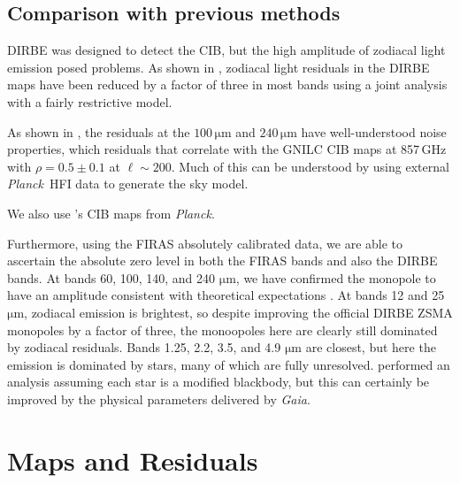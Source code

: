 \documentclass{aa}
\def\Planck{\textit{Planck}}
\begin{document}
\subsection{Comparison with previous methods}

DIRBE was designed to detect the CIB, but the high amplitude of zodiacal light emission posed problems. As shown in \citet{CG02_02}, zodiacal light residuals in the DIRBE maps have been reduced by a factor of three in most bands using a joint analysis with a fairly restrictive model.

As shown in \citet{CG02_01}, the residuals at the $100\,\mathrm{\mu m}$ and $240\,\mathrm{\mu m}$ have well-understood noise properties, which residuals that correlate with the GNILC \citet{planck2016-XLVIII} CIB maps at 857\,GHz with $\rho=0.5\pm0.1$ at $\ell\sim200$. Much of this can be understood by using external \Planck\ HFI data to generate the sky model. 

We also use \citet{lenz2019}'s CIB maps from \Planck.

Furthermore, using the FIRAS absolutely calibrated data, we are able to ascertain the absolute zero level in both the FIRAS bands and also the DIRBE bands. At bands 60, 100, 140, and 240 $\mathrm{\mu m}$, we have confirmed the monopole to have an amplitude consistent with theoretical expectations \citep{finke2022}. At bands 12 and 25 $\mathrm{\mu m}$, zodiacal emission is brightest, so despite improving the official DIRBE ZSMA monopoles by a factor of three, the monoopoles here are clearly still dominated by zodiacal residuals. Bands 1.25, 2.2, 3.5, and 4.9 $\mathrm{\mu m}$ are closest, but here the emission is dominated by stars, many of which are fully unresolved. \citet{CG02_01} performed an analysis assuming each star is a modified blackbody, but this can certainly be improved by the physical parameters delivered by \textit{Gaia}.


\section{Maps and Residuals}
\label{sec:maps_and_residuals}

\lipsum 
\end{document}
